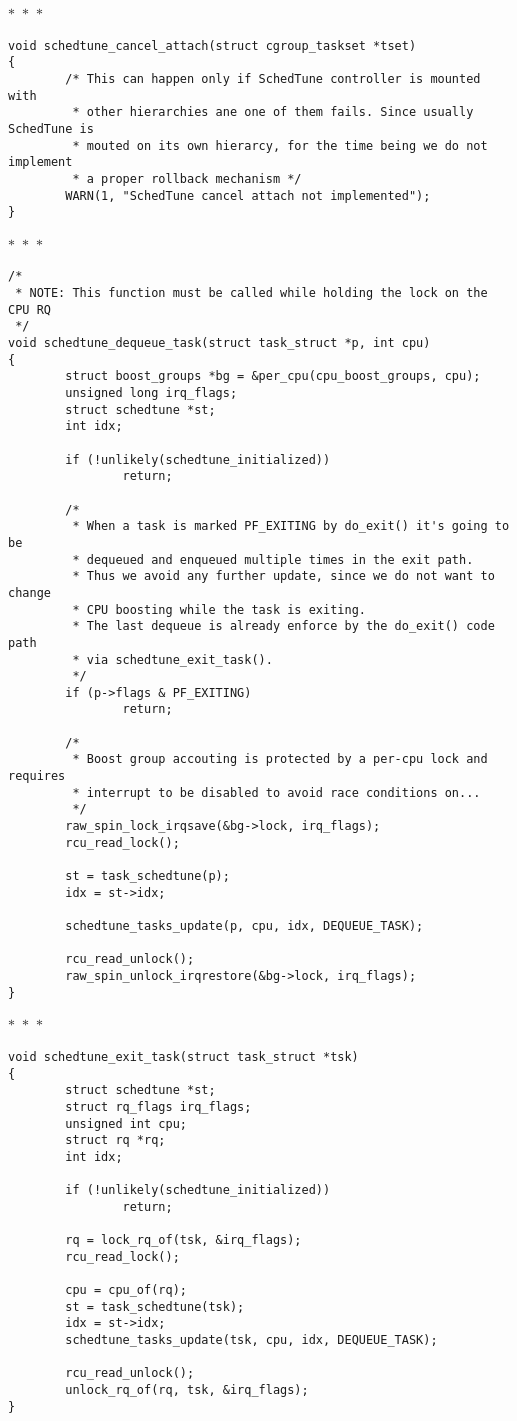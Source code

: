 \documentclass{article}
\newcommand{\divider}{{\begin{center}
  $\ast$~$\ast$~$\ast$
\end{center}}}
\begin{document}
\divider
\begin{verbatim}
void schedtune_cancel_attach(struct cgroup_taskset *tset)
{
        /* This can happen only if SchedTune controller is mounted with
         * other hierarchies ane one of them fails. Since usually SchedTune is
         * mouted on its own hierarcy, for the time being we do not implement
         * a proper rollback mechanism */
        WARN(1, "SchedTune cancel attach not implemented");
}
\end{verbatim}
\divider
\begin{verbatim}
/*
 * NOTE: This function must be called while holding the lock on the CPU RQ
 */
void schedtune_dequeue_task(struct task_struct *p, int cpu)
{
        struct boost_groups *bg = &per_cpu(cpu_boost_groups, cpu);
        unsigned long irq_flags;
        struct schedtune *st;
        int idx;

        if (!unlikely(schedtune_initialized))
                return;

        /*
         * When a task is marked PF_EXITING by do_exit() it's going to be
         * dequeued and enqueued multiple times in the exit path.
         * Thus we avoid any further update, since we do not want to change
         * CPU boosting while the task is exiting.
         * The last dequeue is already enforce by the do_exit() code path
         * via schedtune_exit_task().
         */
        if (p->flags & PF_EXITING)
                return;

        /*
         * Boost group accouting is protected by a per-cpu lock and requires
         * interrupt to be disabled to avoid race conditions on...
         */
        raw_spin_lock_irqsave(&bg->lock, irq_flags);
        rcu_read_lock();

        st = task_schedtune(p);
        idx = st->idx;

        schedtune_tasks_update(p, cpu, idx, DEQUEUE_TASK);

        rcu_read_unlock();
        raw_spin_unlock_irqrestore(&bg->lock, irq_flags);
}
\end{verbatim}
\divider
\begin{verbatim}
void schedtune_exit_task(struct task_struct *tsk)
{
        struct schedtune *st;
        struct rq_flags irq_flags;
        unsigned int cpu;
        struct rq *rq;
        int idx;

        if (!unlikely(schedtune_initialized))
                return;

        rq = lock_rq_of(tsk, &irq_flags);
        rcu_read_lock();

        cpu = cpu_of(rq);
        st = task_schedtune(tsk);
        idx = st->idx;
        schedtune_tasks_update(tsk, cpu, idx, DEQUEUE_TASK);

        rcu_read_unlock();
        unlock_rq_of(rq, tsk, &irq_flags);
}
\end{verbatim}
\end{document}
